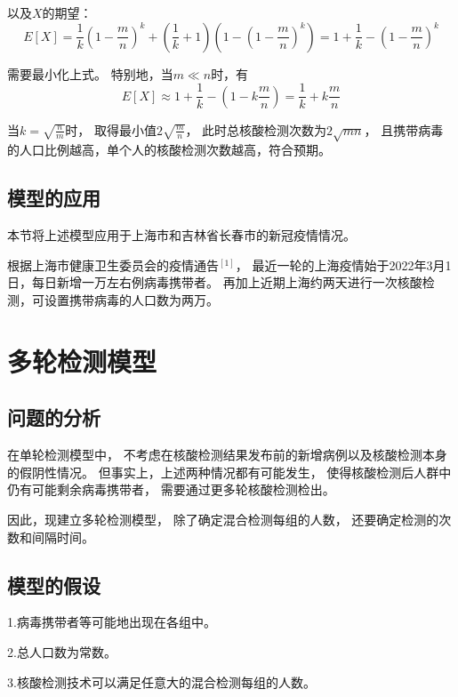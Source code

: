 \documentclass[12pt]{article}
\begin{document}
以及$X$的期望：
\begin{equation*}
E[X]
= \frac{1}{k} (1 - \frac{m}{n})^k + 
(\frac{1}{k} + 1)(1 - (1 - \frac{m}{n})^k)
= 1 + \frac{1}{k} - (1 - \frac{m}{n})^k
\end{equation*}

需要最小化上式。
特别地，当$ m \ll n $时，有
\begin{equation*}
E[X] \approx 1 + \frac{1}{k} - (1 - k\frac{m}{n})
= \frac{1}{k} + k\frac{m}{n}
\end{equation*}

当$ k = \sqrt{\frac{n}{m}} $时，
取得最小值$2\sqrt{\frac{m}{n}}$，
此时总核酸检测次数为$2\sqrt{mn}$，
且携带病毒的人口比例越高，单个人的核酸检测次数越高，符合预期。

\subsection{模型的应用}

本节将上述模型应用于上海市和吉林省长春市的新冠疫情情况。

根据上海市健康卫生委员会的疫情通告$^{[1]}$，
最近一轮的上海疫情始于2022年3月1日，每日新增一万左右例病毒携带者。
再加上近期上海约两天进行一次核酸检测，可设置携带病毒的人口数为两万。

\newpage
{\centering\section{多轮检测模型}}

\subsection{问题的分析}

在单轮检测模型中，
不考虑在核酸检测结果发布前的新增病例以及核酸检测本身的假阴性情况。
但事实上，上述两种情况都有可能发生，
使得核酸检测后人群中仍有可能剩余病毒携带者，
需要通过更多轮核酸检测检出。

因此，现建立多轮检测模型，
除了确定混合检测每组的人数，
还要确定检测的次数和间隔时间。

\subsection{模型的假设}

1.病毒携带者等可能地出现在各组中。

2.总人口数为常数。

3.核酸检测技术可以满足任意大的混合检测每组的人数。
\end{document}
